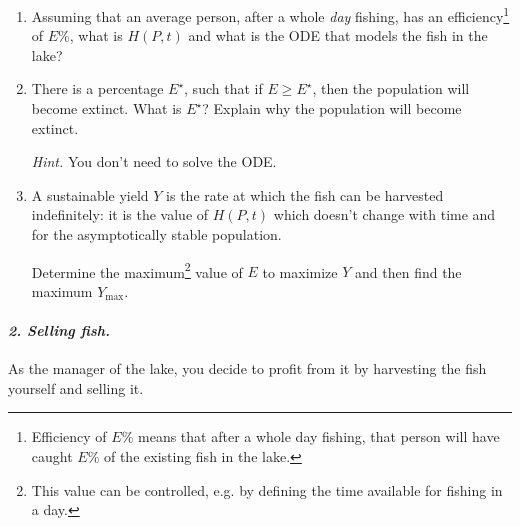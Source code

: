 \begin{enumerate}[label=\emph{(\alph*)}]
\item Assuming that an average person, after a whole \emph{day} fishing, has an efficiency\footnote{Efficiency of $E\%$ means that after a whole day fishing, that person will have caught $E\%$ of the existing fish in the lake.} of $E\%$, what is $H(P,t)$ and what is the ODE that models the fish in the lake?

\item There is a percentage $E^\star$, such that if $E \geq E^\star$, then the population will become extinct. What is $E^\star$? Explain why the population will become extinct.

\emph{Hint.} You don't need to solve the ODE.



\item A sustainable yield $Y$ is the rate at which the fish can be harvested indefinitely: it is the value of $H(P,t)$ which doesn't change with time and for the asymptotically stable population.

Determine the maximum\footnote{This value can be controlled, e.g. by defining the time available for fishing in a day.} value of $E$ to maximize $Y$ and then find the maximum $Y_{\max}$.



\end{enumerate}







\vfill

\paragraph{\emph{2. Selling fish.}}

As the manager of the lake, you decide to profit from it by harvesting the fish yourself and selling it. 

